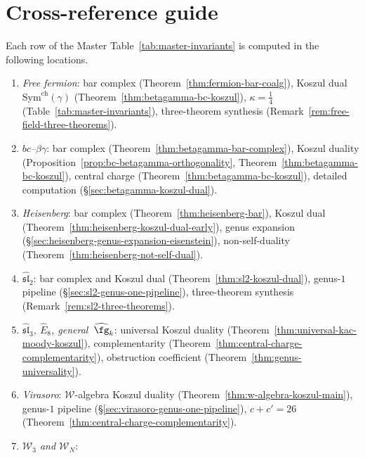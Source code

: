 \section*{Cross-reference guide}
\label{sec:cross-ref-guide}

\begin{remark}\label{rem:cross-ref-guide}
Each row of the Master Table~\textup{\ref{tab:master-invariants}} is
computed in the following locations.
\begin{enumerate}
\item \emph{Free fermion}:
  bar complex (Theorem~\ref{thm:fermion-bar-coalg}),
  Koszul dual $\mathrm{Sym}^{\mathrm{ch}}(\gamma)$
  (Theorem~\ref{thm:betagamma-bc-koszul}),
  $\kappa = \tfrac{1}{4}$ (Table~\ref{tab:master-invariants}),
  three-theorem synthesis
  (Remark~\ref{rem:free-field-three-theorems}).
\item \emph{$bc$--$\beta\gamma$}:
  bar complex (Theorem~\ref{thm:betagamma-bar-complex}),
  Koszul duality
  (Proposition~\ref{prop:bc-betagamma-orthogonality},
  Theorem~\ref{thm:betagamma-bc-koszul}),
  central charge (Theorem~\ref{thm:betagamma-bc-koszul}),
  detailed computation (\S\ref{sec:betagamma-koszul-dual}).
\item \emph{Heisenberg}:
  bar complex (Theorem~\ref{thm:heisenberg-bar}),
  Koszul dual (Theorem~\ref{thm:heisenberg-koszul-dual-early}),
  genus expansion
  (\S\ref{sec:heisenberg-genus-expansion-eisenstein}),
  non-self-duality (Theorem~\ref{thm:heisenberg-not-self-dual}).
\item \emph{$\widehat{\mathfrak{sl}}_2$}:
  bar complex and Koszul dual
  (Theorem~\ref{thm:sl2-koszul-dual}),
  genus-$1$ pipeline (\S\ref{sec:sl2-genus-one-pipeline}),
  three-theorem synthesis (Remark~\ref{rem:sl2-three-theorems}).
\item \emph{$\widehat{\mathfrak{sl}}_3$, $\widehat{E}_8$,
  general~$\widehat{\fg}_k$}:
  universal Koszul duality
  (Theorem~\ref{thm:universal-kac-moody-koszul}),
  complementarity
  (Theorem~\ref{thm:central-charge-complementarity}),
  obstruction coefficient
  (Theorem~\ref{thm:genus-universality}).
\item \emph{Virasoro}:
  $\mathcal{W}$-algebra Koszul duality
  (Theorem~\ref{thm:w-algebra-koszul-main}),
  genus-$1$ pipeline (\S\ref{sec:virasoro-genus-one-pipeline}),
  $c + c' = 26$
  (Theorem~\ref{thm:central-charge-complementarity}).
\item \emph{$\mathcal{W}_3$ and $\mathcal{W}_N$}:

\end{enumerate}
\end{remark}
